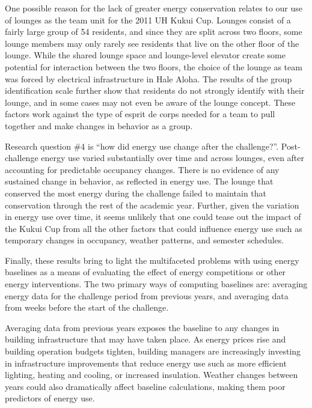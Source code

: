 One possible reason for the lack of greater energy conservation relates to our use of lounges as the team unit for the 2011 UH Kukui Cup. Lounges consist of a fairly large group of 54 residents, and since they are split across two floors, some lounge members may only rarely see residents that live on the other floor of the lounge. While the shared lounge space and lounge-level elevator create some potential for interaction between the two floors, the choice of the lounge as team was forced by electrical infrastructure in Hale Aloha. The results of the group identification scale further show that residents do not strongly identify with their lounge, and in some cases may not even be aware of the lounge concept. These factors work against the type of esprit de corps needed for a team to pull together and make changes in behavior as a group.

Research question \#4 is ``how did energy use change after the challenge?''. Post-challenge energy use varied substantially over time and across lounges, even after accounting for predictable occupancy changes. There is no evidence of any sustained change in behavior, as reflected in energy use. The lounge that conserved the most energy during the challenge failed to maintain that conservation through the rest of the academic year. Further, given the variation in energy use over time, it seems unlikely that one could tease out the impact of the Kukui Cup from all the other factors that could influence energy use such as temporary changes in occupancy, weather patterns, and semester schedules.

Finally, these results bring to light the multifaceted problems with using energy baselines as a means of evaluating the effect of energy competitions or other energy interventions. The two primary ways of computing baselines are: averaging energy data for the challenge period from previous years, and averaging data from weeks before the start of the challenge.

Averaging data from previous years exposes the baseline to any changes in building infrastructure that may have taken place. As energy prices rise and building operation budgets tighten, building managers are increasingly investing in infrastructure improvements that reduce energy use such as more efficient lighting, heating and cooling, or increased insulation. Weather changes between years could also dramatically affect baseline calculations, making them poor predictors of energy use.

